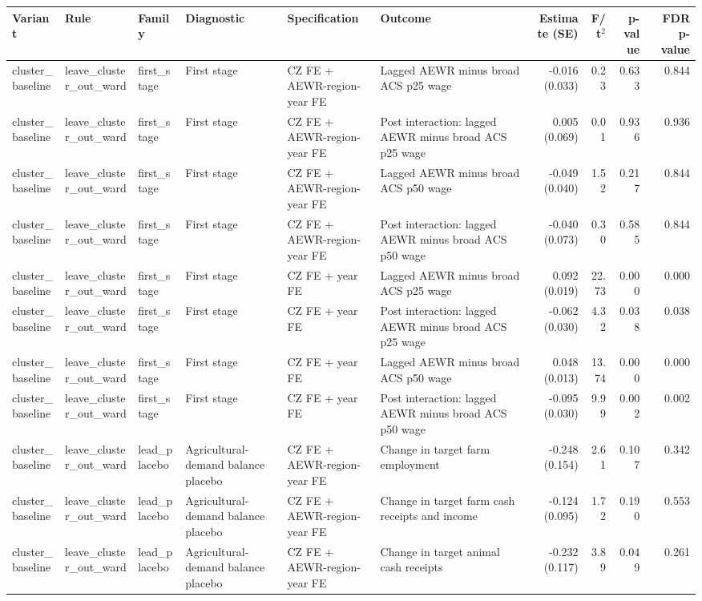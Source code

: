 \begin{tabular}{llllllrrrr}
\toprule
Variant & Rule & Family & Diagnostic & Specification & Outcome & Estimate (SE) & F/t$^2$ & p-value & FDR p-value \\
\midrule
cluster_baseline & leave_cluster_out_ward & first_stage & First stage & CZ FE + AEWR-region-year FE & Lagged AEWR minus broad ACS p25 wage & -0.016 (0.033) & 0.23 & 0.633 & 0.844 \\
cluster_baseline & leave_cluster_out_ward & first_stage & First stage & CZ FE + AEWR-region-year FE & Post interaction: lagged AEWR minus broad ACS p25 wage & 0.005 (0.069) & 0.01 & 0.936 & 0.936 \\
cluster_baseline & leave_cluster_out_ward & first_stage & First stage & CZ FE + AEWR-region-year FE & Lagged AEWR minus broad ACS p50 wage & -0.049 (0.040) & 1.52 & 0.217 & 0.844 \\
cluster_baseline & leave_cluster_out_ward & first_stage & First stage & CZ FE + AEWR-region-year FE & Post interaction: lagged AEWR minus broad ACS p50 wage & -0.040 (0.073) & 0.30 & 0.585 & 0.844 \\
cluster_baseline & leave_cluster_out_ward & first_stage & First stage & CZ FE + year FE & Lagged AEWR minus broad ACS p25 wage & 0.092 (0.019) & 22.73 & 0.000 & 0.000 \\
cluster_baseline & leave_cluster_out_ward & first_stage & First stage & CZ FE + year FE & Post interaction: lagged AEWR minus broad ACS p25 wage & -0.062 (0.030) & 4.32 & 0.038 & 0.038 \\
cluster_baseline & leave_cluster_out_ward & first_stage & First stage & CZ FE + year FE & Lagged AEWR minus broad ACS p50 wage & 0.048 (0.013) & 13.74 & 0.000 & 0.000 \\
cluster_baseline & leave_cluster_out_ward & first_stage & First stage & CZ FE + year FE & Post interaction: lagged AEWR minus broad ACS p50 wage & -0.095 (0.030) & 9.99 & 0.002 & 0.002 \\
cluster_baseline & leave_cluster_out_ward & lead_placebo & Agricultural-demand balance placebo & CZ FE + AEWR-region-year FE & Change in target farm employment & -0.248 (0.154) & 2.61 & 0.107 & 0.342 \\
cluster_baseline & leave_cluster_out_ward & lead_placebo & Agricultural-demand balance placebo & CZ FE + AEWR-region-year FE & Change in target farm cash receipts and income & -0.124 (0.095) & 1.72 & 0.190 & 0.553 \\
cluster_baseline & leave_cluster_out_ward & lead_placebo & Agricultural-demand balance placebo & CZ FE + AEWR-region-year FE & Change in target animal cash receipts & -0.232 (0.117) & 3.89 & 0.049 & 0.261 \\

\end{tabular}
